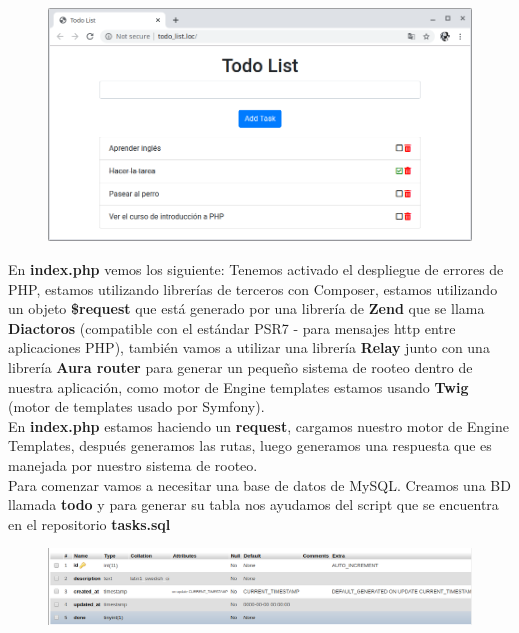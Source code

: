 \documentclass{article}
\begin{document}
\begin{figure}[h!]
  \centering
  \includegraphics[scale=0.5]{./Pictures/100_plantillaok.png}
\end{figure}

En \textbf{index.php} vemos los siguiente: Tenemos activado el despliegue de
errores de PHP, estamos utilizando librerías de terceros con Composer, estamos
utilizando un objeto \textbf{\$request} que está generado por una librería de
\textbf{Zend} que se llama \textbf{Diactoros} (compatible con el estándar PSR7
- para mensajes http entre aplicaciones PHP), también vamos a utilizar una
librería \textbf{Relay} junto con una librería \textbf{Aura router} para
generar un pequeño sistema de rooteo dentro de nuestra aplicación, como motor
de Engine templates estamos usando \textbf{Twig} (motor de templates usado por
Symfony).\\

En \textbf{index.php} estamos haciendo un \textbf{request}, cargamos nuestro
motor de Engine Templates, después generamos las rutas, luego generamos una
respuesta que es manejada por nuestro sistema de rooteo.\\

Para comenzar vamos a necesitar una base de datos de MySQL. Creamos una BD
llamada \textbf{todo} y para generar su tabla nos ayudamos del script que se
encuentra en el repositorio \textbf{tasks.sql}\\

\begin{figure}[h!]
  \centering
  \includegraphics[scale=0.5]{./Pictures/101_bdtodo.png}
\end{figure}
\end{document}
